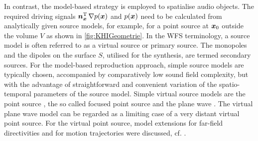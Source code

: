 In contrast, the model-based strategy is employed to spatialise audio objects.
The required driving signals $\bm{n}^\mathrm{T}_{\bm{x}} \, \nabla p(\bm{x})$ and $p(\bm{x})$ need to be
calculated from analytically given source models, for example, for a point source
at $\bm{x}_\mathrm{0}$ outside the volume $V$ as shown in \myfig\ref{fig:KHIGeometrie}.
%
In the WFS terminology, a source model is often referred to as a virtual source
or primary source.
%
The monopoles and the dipoles on the surface $S$, utilised for the synthesis,
are termed secondary sources.
%
For the model-based reproduction approach, simple source models are typically
chosen, accompanied by comparatively low sound field complexity, but with the
advantage of straightforward and convenient variation of the spatio-temporal
parameters of the source model.
%
Simple virtual source models are
the point source \cite{Berkhout1993_JASA,Start1997_diss},
the so called focused point source \cite{Verheijen1997_diss,Spors2007b,
Melchior2008,Wierstorf2014_diss} and
the plane wave \cite{Spors2008a, Voelk2012, Firtha2019_diss}.
%
The virtual plane wave model can be regarded as a limiting case of a very
distant virtual point source.
%
For the virtual point source, model extensions for far-field directivities and
for motion trajectories were discussed, cf. \cite{Corteel2007_JASP,Baalman2008_diss,
Franck2012,Romoli2015_ApplAc,Schultz2017,Franck2007,Ahrens2011,Firtha2019_diss}.



